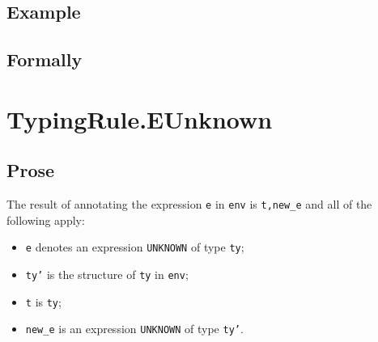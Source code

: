 \documentclass{book}
\newcommand\annotateexpr[1]{\textsf{annotate\_expr}(#1)}
\newcommand\vt[0]{\texttt{t}}
\begin{document}
\begin{itemize}
  \subsection{Example}



\begin{emptyformal}
    \subsection{Formally}
\end{emptyformal}


\section{TypingRule.EUnknown \label{sec:TypingRule.EUnknown}}

  \subsection{Prose}
  The result of annotating the expression \texttt{e} in \texttt{env} is
\texttt{t,new\_e} and all of the following apply:
  \begin{itemize}
  \item \texttt{e} denotes an expression \texttt{UNKNOWN} of type \texttt{ty};
  \item \texttt{ty'} is the structure of \texttt{ty} in \texttt{env};
  \item \texttt{t} is \texttt{ty};
  \item \texttt{new\_e} is an expression \texttt{UNKNOWN} of type \texttt{ty'}.
  \end{itemize}


\end{itemize}
\end{document}
